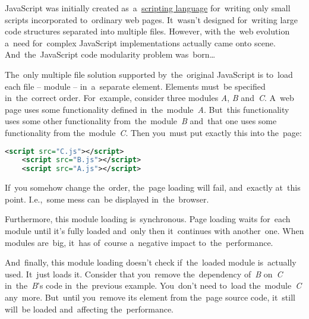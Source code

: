\label{javascriptmodularity}
JavaScript was initially created as~a~\hyperref[scriptinglanguages]{scripting language} for~writing only small scripts incorporated to~ordinary web pages.
It~wasn't designed for~writing large code structures separated into multiple files.
However, with the~web evolution a~need for~complex JavaScript implementations actually came onto scene.
And~the~JavaScript code modularity problem was~born\dots

The~only multiple file solution supported by~the~original JavaScript is to~load each file -- module --  in~a~separate  element.
Elements must~be specified in~the~correct order.
For~example, consider three modules \textit{A}, \textit{B} and~\textit{C}.
A~web page uses some functionality defined in~the~module~\textit{A}.
But~this functionality uses some other functionality from~the~module~\textit{B} and~that one uses some functionality from the~module~\textit{C}.
Then you~must put exactly this into the~page:

\begin{lstlisting}[language=XML,frame=no]
    <script src="C.js"></script>
    <script src="B.js"></script>
    <script src="A.js"></script>
\end{lstlisting}

\noindent If~you somehow change the~order, the~page loading will fail, and~exactly at~this point.
I.e.,~some mess can~be displayed in~the~browser.

Furthermore, this module loading is~synchronous.
Page loading waits for~each module until it's fully loaded and~only then it~continues with another~one.
When modules are~big, it~has of~course a~negative impact to~the~performance.

And~finally, this module loading doesn't check if~the~loaded module is~actually used.
It~just loads it.
Consider that you~remove the~dependency of~\textit{B} on~\textit{C} in~the~\textit{B}'s code in~the~previous example.
You~don't need to~load the~module~\textit{C} any~more.
But~until you~remove its  element from the~page source code, it~still will~be loaded and~affecting the~performance.
